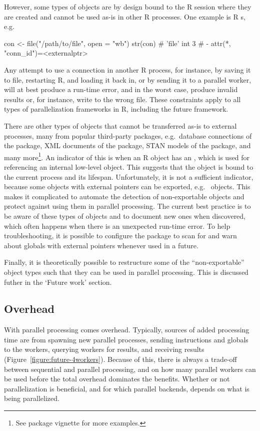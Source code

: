 However, some types of objects are by design bound to the R session
where they are created and cannot be used as-is in other R processes.
One example is R s, e.g.
\begin{example}
con <- file("/path/to/file", open = "wb")
str(con)
#  'file' int 3
#  - attr(*, "conn_id")=<externalptr> 
\end{example}
Any attempt to use a connection in another R process, for instance, by
saving it to file, restarting R, and loading it back in, or by sending
it to a parallel worker, will at best produce a run-time error, and in
the worst case, produce invalid results or, for instance, write to the
wrong file.  These constraints apply to all types of parallelization
frameworks in R, including the future framework.

There are other types of objects that cannot be transferred as-is to
external processes, many from popular third-party packages, e.g.\
database connections of the  package, XML documents of
the \CRANpkg{xml2} package, STAN models of the \CRANpkg{stan} package,
and many more\footnote{See \pkg{future} package vignette
 for more examples.}.
An indicator of this is when an R object has an , which is used for referencing an internal low-level
object. This suggests that the object is bound to the current process
and its lifespan.  Unfortunately, it is not a sufficient indicator,
because some objects with external pointers can be exported,
e.g.\  objects.  This makes it complicated to
automate the detection of non-exportable objects and protect against
using them in parallel processing.  The current best practice is to be
aware of these types of objects and to document new ones when
discovered, which often happens when there is an unexpected run-time
error.  To help troubleshooting, it is possible to configure
the  package to scan for and warn about globals with
external pointers whenever used in a future.

Finally, it is theoretically possible to restructure some of the
``non-exportable'' object types such that they can be used in parallel
processing.  This is discussed futher in the `Future work' section.


\subsection{Overhead}
\label{overhead}

With parallel processing comes overhead.  Typically, sources of added
processing time are from spawning new parallel processes,
sending instructions and globals to the workers, querying workers for
results, and receiving results (Figure~\ref{figure:future-4workers}).
Because of this, there is always a trade-off between sequential and
parallel processing, and on how many parallel workers can be used
before the total overhead dominates the benefits.  Whether or not
parallelization is beneficial, and for which parallel backends,
depends on what is being parallelized.

